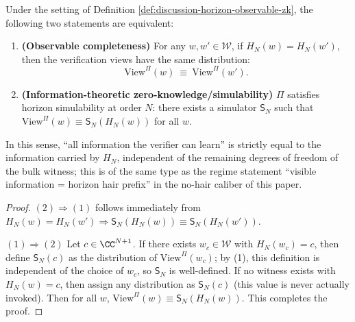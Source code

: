 \begin{proposition}\label{prop:discussion-nohair-iff-zk}
Under the setting of Definition \ref{def:discussion-horizon-observable-zk}, the following two statements are equivalent:
\begin{enumerate}
  \item \textbf{(Observable completeness)} For any \(w,w'\in\mathcal{W}\), if \(H_N(w)=H_N(w')\), then the verification views have the same distribution:
  \[
  \mathrm{View}^{\Pi}(w)\ \equiv\ \mathrm{View}^{\Pi}(w').
  \]
  \item \textbf{(Information-theoretic zero-knowledge/simulability)} \(\Pi\) satisfies horizon simulability at order \(N\): there exists a simulator \(\mathsf{S}_N\) such that \(\mathrm{View}^{\Pi}(w)\equiv \mathsf{S}_N(H_N(w))\) for all \(w\).
\end{enumerate}
In this sense, ``all information the verifier can learn'' is strictly equal to the information carried by \(H_N\), independent of the remaining degrees of freedom of the bulk witness; this is of the same type as the regime statement ``visible information = horizon hair prefix'' in the no-hair caliber of this paper.
\end{proposition}

\begin{proof}
\((2)\Rightarrow(1)\) follows immediately from \(H_N(w)=H_N(w')\Rightarrow \mathsf{S}_N(H_N(w))\equiv \mathsf{S}_N(H_N(w'))\).
\par
\((1)\Rightarrow(2)\) Let \(c\in\CC^{N+1}\).
If there exists \(w_c\in\mathcal{W}\) with \(H_N(w_c)=c\), then define \(\mathsf{S}_N(c)\) as the distribution of \(\mathrm{View}^\Pi(w_c)\);
by (1), this definition is independent of the choice of \(w_c\), so \(\mathsf{S}_N\) is well-defined.
If no witness exists with \(H_N(w)=c\), then assign any distribution as \(\mathsf{S}_N(c)\) (this value is never actually invoked).
Then for all \(w\), \(\mathrm{View}^\Pi(w)\equiv \mathsf{S}_N(H_N(w))\). This completes the proof.
\end{proof}

